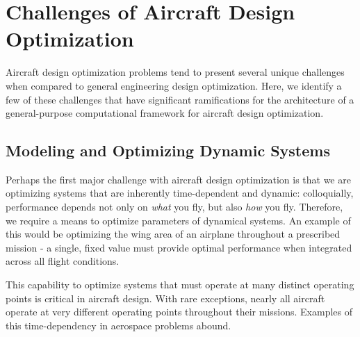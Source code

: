 \chapter{Challenges of Aircraft Design Optimization}
\label{chapter:challenges}

Aircraft design optimization problems tend to present several unique challenges when compared to general engineering design optimization. Here, we identify a few of these challenges that have significant ramifications for the architecture of a general-purpose computational framework for aircraft design optimization.


\section{Modeling and Optimizing Dynamic Systems}
\label{sect:dynamics}

Perhaps the first major challenge with aircraft design optimization is that we are optimizing systems that are inherently time-dependent and dynamic: colloquially, performance depends not only on \textit{what} you fly, but also \textit{how} you fly. Therefore, we require a means to optimize parameters of dynamical systems. An example of this would be optimizing the wing area of an airplane throughout a prescribed mission - a single, fixed value must provide optimal performance when integrated across all flight conditions.

This capability to optimize systems that must operate at many distinct operating points is critical in aircraft design. With rare exceptions, nearly all aircraft operate at very different operating points throughout their missions. Examples of this time-dependency in aerospace problems abound.

